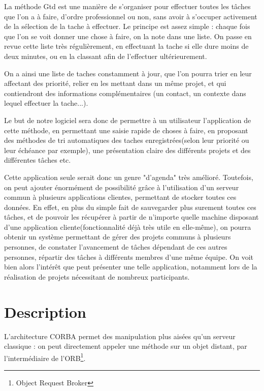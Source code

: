 \documentclass[a4paper, french, 11pt]{report}
\begin{document}
La méthode Gtd est une manière de s'organiser pour effectuer toutes les tâches que l'on a à faire, d'ordre professionnel ou non, sans avoir à s'occuper activement de la sélection de la tache à effectuer. Le principe est assez simple : chaque fois que l'on se voit donner une chose à faire, on la note dans une liste. On passe en revue cette liste  très régulièrement, en effectuant la tache si elle dure moins de deux minutes, ou en la classant afin de l'effectuer ultérieurement.
	
On a ainsi une liste de taches constamment à jour, que l'on pourra trier en leur affectant des priorité, relier en les mettant dans un même projet, et qui contiendront des informations complémentaires (un contact, un contexte dans lequel effectuer la tache...).

Le but de notre logiciel sera donc de permettre à un utilisateur l'application de cette méthode, en permettant une saisie rapide de choses à faire, en proposant des méthodes de tri automatiques des taches enregistrées(selon leur priorité ou leur échéance par exemple), une présentation claire des différents projets et des différentes tâches etc.

Cette application seule serait donc un genre "d'agenda" très amélioré.
Toutefois, on peut ajouter énormément de possibilité grâce à l'utilisation d'un serveur commun à plusieurs applications clientes, permettant de stocker toutes ces données.
En effet, en plus du simple fait de sauvegarder plus surement toutes ces tâches, et de pouvoir les récupérer à partir de n'importe quelle machine disposant d'une application cliente(fonctionnalité déjà très utile en elle-même), on pourra obtenir un système permettant de gérer des projets communs à plusieurs personnes, de constater l'avancement de tâches dépendant de ces autres personnes, répartir des tâches à différents membres d'une même équipe. On voit bien alors l'intérêt que peut présenter une telle application, notamment lors de la réalisation de projets nécessitant de nombreux participants.
	
\section{Description}	
	
L'architecture CORBA permet des manipulation plus aisées qu'un serveur classique : on peut directement appeler une méthode sur un objet distant, par l'intermédiaire de l'ORB\footnote{Object Request Broker}.
\end{document}
